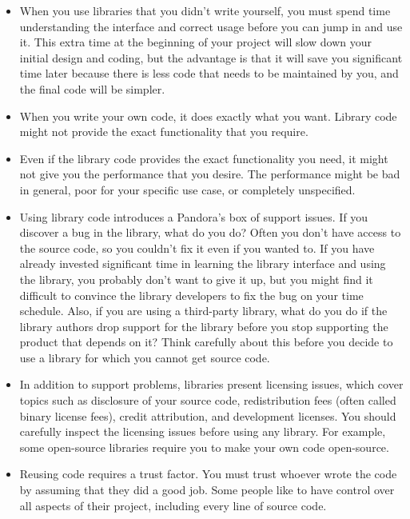 \begin{itemize}
\item
When you use libraries that you didn’t write yourself, you must spend time understanding the interface and correct usage before you can jump in and use it. This extra time at the beginning of your project will slow down your initial design and coding, but the advantage is that it will save you significant time later because there is less code that needs to be maintained by you, and the final code will be simpler.

\item
When you write your own code, it does exactly what you want. Library code might not provide the exact functionality that you require.

\item
Even if the library code provides the exact functionality you need, it might not give you the performance that you desire. The performance might be bad in general, poor for your specific use case, or completely unspecified.

\item
Using library code introduces a Pandora’s box of support issues. If you discover a bug in the library, what do you do? Often you don’t have access to the source code, so you couldn’t fix it even if you wanted to. If you have already invested significant time in learning the library interface and using the library, you probably don’t want to give it up, but you might find it difficult to convince the library developers to fix the bug on your time schedule. Also, if you are using a third-party library, what do you do if the library authors drop support for the library before you stop supporting the product that depends on it? Think carefully about this before you decide to use a library for which you cannot get source code.

\item
In addition to support problems, libraries present licensing issues, which cover topics such as disclosure of your source code, redistribution fees (often called binary license fees), credit attribution, and development licenses. You should carefully inspect the licensing issues before using any library. For example, some open-source libraries require you to make your own code open-source.

\item
Reusing code requires a trust factor. You must trust whoever wrote the code by assuming that they did a good job. Some people like to have control over all aspects of their project, including every line of source code.


\end{itemize}
